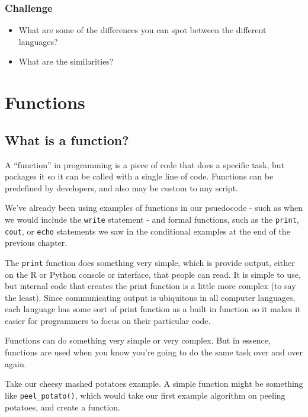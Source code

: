 \documentclass[
]{book}
\providecommand{\tightlist}{%
  \setlength{\itemsep}{0pt}\setlength{\parskip}{0pt}}
\begin{document}
\subsection{Challenge}\label{challenge}

\begin{itemize}
\tightlist
\item
  What are some of the differences you can spot between the different languages?
\item
  What are the similarities?
\end{itemize}

\chapter{Functions}\label{functions}

\section{What is a function?}\label{what-is-a-function}

A ``function'' in programming is a piece of code that does a specific task, but packages it so it can be called with a single line of code. Functions can be predefined by developers, and also may be custom to any script.

We've already been using examples of functions in our psuedocode - such as when we would include the \texttt{write} statement - and formal functions, such as the \texttt{print}, \texttt{cout}, or \texttt{echo} statements we saw in the conditional examples at the end of the previous chapter.

The \texttt{print} function does something very simple, which is provide output, either on the R or Python console or interface, that people can read. It is simple to use, but internal code that creates the print function is a little more complex (to say the least). Since communicating output is ubiquitous in all computer languages, each language has some sort of print function as a built in function so it makes it easier for programmers to focus on their particular code.

Functions can do something very simple or very complex. But in essence, functions are used when you know you're going to do the same task over and over again.

Take our cheesy mashed potatoes example. A simple function might be something like \texttt{peel\_potato()}, which would take our first example algorithm on peeling potatoes, and create a function.
\end{document}
